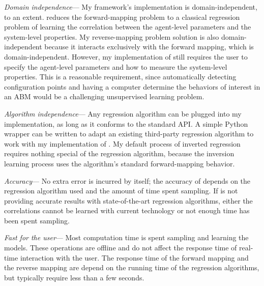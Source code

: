 \textit{Domain independence}---
My framework's implementation is domain-independent, to an extent. \fw reduces the forward-mapping problem to a classical regression problem of learning the correlation between the agent-level parameters and the system-level properties.
My reverse-mapping problem solution is also domain-independent because it interacts exclusively with the forward mapping, which is domain-independent.
However, my implementation of \fw still requires the user to specify the agent-level parameters and how to measure the system-level properties.
This is a reasonable requirement, since automatically detecting configuration points and having a computer determine the behaviors of interest in an ABM would be a challenging unsupervised learning problem.

\textit{Algorithm independence}---
Any regression algorithm can be plugged into my implementation, as long as it conforms to the standard API.
A simple Python wrapper can be written to adapt an existing third-party regression algorithm to work with my implementation of \fw.
My  default process of inverted regression requires nothing special of the regression algorithm, because the inversion learning process uses the algorithm's standard forward-mapping behavior.

\textit{Accuracy}---
No extra error is incurred by \fw itself;
the accuracy of \fw depends on the regression algorithm used and the amount of time spent sampling.
If \fw is not providing accurate results with state-of-the-art regression algorithms, either the correlations cannot be learned with current technology or not enough time has been spent sampling.


\textit{Fast for the user}---
Most computation time is spent sampling and learning the models.
These operations are offline and do not affect the response time of real-time interaction with the user.
The response time of the forward mapping and the reverse mapping are depend on the running time of the regression algorithms, but typically require less than a few seconds.





